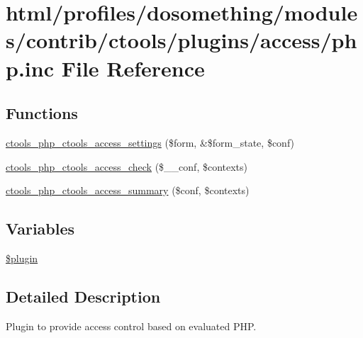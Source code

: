 \hypertarget{php_8inc}{
\section{html/profiles/dosomething/modules/contrib/ctools/plugins/access/php.inc File Reference}
\label{php_8inc}
}
\subsection*{Functions}
\begin{DoxyCompactItemize}
\item 
\hyperlink{php_8inc_ad173cf9e9891ef70924fad63a89396fa}{ctools\_\-php\_\-ctools\_\-access\_\-settings} (\$form, \&\$form\_\-state, \$conf)
\item 
\hyperlink{php_8inc_a7acb817afdb0c9ef7b1c6fa6cc71674f}{ctools\_\-php\_\-ctools\_\-access\_\-check} (\$\_\-\_\-conf, \$contexts)
\item 
\hyperlink{php_8inc_ad017dbac9fb627e7fb7cb9ac4cd95147}{ctools\_\-php\_\-ctools\_\-access\_\-summary} (\$conf, \$contexts)
\end{DoxyCompactItemize}
\subsection*{Variables}
\begin{DoxyCompactItemize}
\item 
\hyperlink{php_8inc_ada8a7130088351710bb02ed622d6bf65}{\$plugin}
\end{DoxyCompactItemize}


\subsection{Detailed Description}
Plugin to provide access control based on evaluated PHP. 


